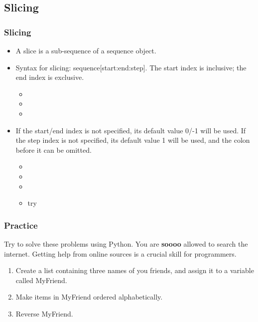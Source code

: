 \documentclass[xcolor={usenames, dvipsnames}, hyperref={colorlinks,linkcolor=black, urlcolor=blue}]{beamer}
\begin{document}
\subsection{Slicing} 
\begin{frame}
\frametitle{Slicing}

\begin{itemize}
\item A slice is a sub-sequence of a sequence object.
\end{itemize}

\begin{itemize}
\item Syntax for slicing: sequence[start:end:step]. The start index is inclusive; the end index is exclusive.
	\begin{itemize}
	\item {}
	\item {}
	\item {}
	\end{itemize}
\end{itemize}

\begin{itemize}
\item If the start/end index is not specified, its default value 0/-1 will be used. If the step index is not specified, its default value 1 will be used, and the colon before it can be omitted.
	\begin{itemize}
	\item {}
	\item {}
	\item {}
	\item try 
	\end{itemize}
\end{itemize}

\end{frame}


\begin{frame}
\frametitle{Practice}

Try to solve these problems using Python. You are \textbf{soooo} allowed to search the internet. Getting help from online sources is a crucial skill for programmers. 

\begin{enumerate}
\item Create a list containing three names of you friends, and assign it to a variable called MyFriend.
\item Make items in MyFriend ordered alphabetically.
\item Reverse MyFriend.
\end{enumerate}
\end{frame}
\end{document}
